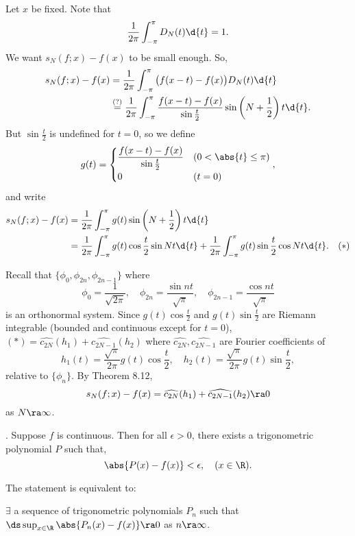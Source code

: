 \pf Let \(x\) be fixed. Note that
\[
    \frac{1}{2\pi} \int_{-\pi}^\pi D_N(t)\d{t} = 1.
\]
We want \(s_N(f;x) - f(x)\) to be small enough. So,
\[
    \begin{aligned}
        s_N(f; x) - f(x) & = \frac{1}{2\pi} \int_{-\pi}^\pi \big(f(x-t) - f(x)\big)D_N(t)\d{t}                                                               \\
                         & \overset{(?)}{=} \frac{1}{2\pi} \int_{-\pi}^\pi \frac{f(x-t) - f(x)}{\sin \frac{t}{2}} \sin \left(N + \frac{1}{2}\right) t \d{t}.
    \end{aligned}
\]
But \(\sin\frac{t}{2}\) is undefined for \(t = 0\), so we define
\[
    g(t) = \begin{cases}
        \dfrac{f(x-t) - f(x)}{\sin \frac{t}{2}} & (0 < \abs{t} \leq \pi) \\
        0                                       & (t = 0)
    \end{cases},
\]
and write
\[
    \begin{aligned}
        s_N(f; x) - f(x) & = \frac{1}{2\pi} \int_{-\pi}^\pi g(t) \sin \left(N + \frac{1}{2}\right) t \d{t}                                                                     \\
                         & = \frac{1}{2\pi} \int_{-\pi}^\pi g(t)\cos\frac{t}{2} \sin Nt \d{t} + \frac{1}{2\pi} \int_{-\pi}^\pi g(t)\sin\frac{t}{2} \cos Nt \d{t}. \quad (\ast)
    \end{aligned}
\]

Recall that \(\{\phi_0, \phi_{2n}, \phi_{2n-1}\}\) where
\[
    \phi_0 = \frac{1}{\sqrt{2\pi}}, \quad \phi_{2n} = \frac{\sin nt}{\sqrt{\pi}}, \quad \phi_{2n-1} = \frac{\cos nt}{\sqrt{\pi}}
\]
is an orthonormal system. Since \(g(t)\cos\frac{t}{2}\) and \(g(t) \sin \frac{t}{2}\) are Riemann integrable (bounded and continuous except for \(t = 0\)), \((\ast) = \widehat{c_{2N}}(h_1) + \widehat{c_{2N-1}}(h_2)\) where \(\widehat{c_{2N}}, \widehat{c_{2N-1}}\) are Fourier coefficients of
\[
    h_1(t) = \frac{\sqrt{\pi}}{2\pi} g(t)\cos \frac{t}{2}, \quad h_2(t) = \frac{\sqrt{\pi}}{2\pi} g(t)\sin \frac{t}{2},
\]
relative to \(\{\phi_n\}\). By {\sffamily Theorem 8.12},
\[
    s_N(f; x) - f(x) = \widehat{c_{2N}}(h_1) + \widehat{c_{2N-1}}(h_2) \ra 0
\]
as \(N \ra \infty\).

\thm. Suppose \(f\) is continuous. Then for all \(\epsilon > 0\), there exists a trigonometric polynomial \(P\) such that,
\[
    \abs{P(x) - f(x)} < \epsilon, \quad (x \in \R).
\]

\rmk The statement is equivalent to:
\begin{center}
    \(\exists\) a sequence of trigonometric polynomials \(P_n\) such that \(\ds \sup_{x\in \R} \abs{P_n(x) - f(x)} \ra 0\) as \(n \ra \infty\).
\end{center}


